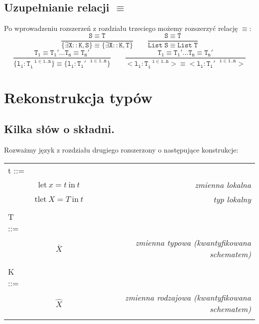 \documentclass[11pt,leqno]{article}
\begin{document}
\subsection{Uzupełnianie relacji $\mathtt{\equiv}$}

Po wprowadzeniu rozszerzeń z rozdziału trzeciego możemy rozszerzyć relację $\mathtt{\equiv}$:
        \[\mathtt{ \frac{S \equiv T}{\{\exists X::K,S\} \equiv \{\exists X::K,T\}}
                   \qquad
                   \frac{S \equiv T}{List\;S \equiv List\;T}
		}
	\]
        \[\mathtt{ \frac{T_1 \equiv T_1' \dots T_n \equiv T_n'}{\{l_i:T_i^{\;\;\;i \in 1..n}\} \equiv \{l_i:T_i'^{\;\;\;i \in 1..n}\}}
                   \qquad
                   \frac{T_1 \equiv T_1' \dots T_n \equiv T_n'}{<l_i:T_i^{\;\;\;i \in 1..n}> \equiv <l_i:T_i'^{\;\;\;i \in 1..n}>}
		}
	\]
\section{Rekonstrukcja typów}


\subsection{Kilka słów o składni.}

Rozważmy język z rozdziału drugiego rozszerzony o następujące konstrukcje: \\

\begin{tabular}{| l c r |}
  \hline
  t ::= &  &  \\
   & $\textrm{let} \ x = t \ \textrm{in} \ t$ & \textit{zmienna lokalna} \\
   & $\textrm{tlet} \ X = T \ \textrm{in} \ t$ & \textit{typ lokalny} \\
   & & \\
  T ::= &  &  \\
   & $\bar{X}$ & \textit{zmienna typowa (kwantyfikowana schematem)} \\
   & & \\
  K ::= & & \\
   & $\widehat{X}$ & \textit{zmienna rodzajowa (kwantyfikowana schematem)} \\
   & & \\
  \hline
\end{tabular} \\
\end{document}
